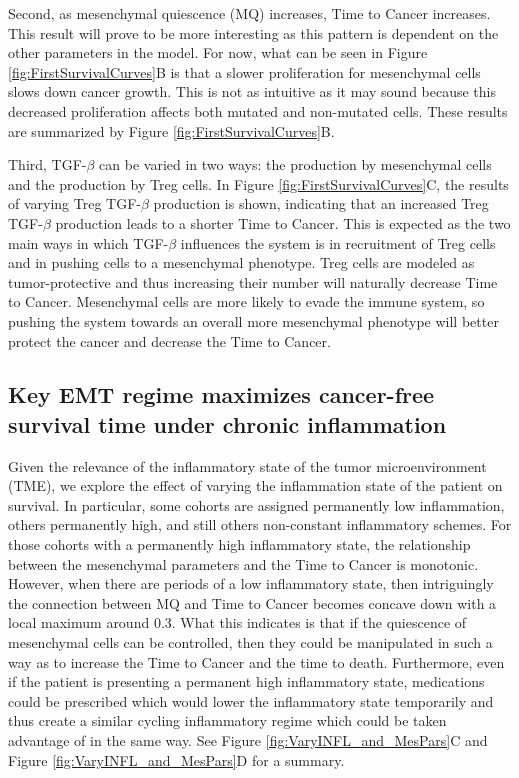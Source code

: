 \documentclass{article}
\begin{document}
Second, as mesenchymal quiescence (MQ) increases, Time to Cancer increases.
This result will prove to be more interesting as this pattern is dependent on the other parameters in the model.
For now, what can be seen in Figure \ref{fig:FirstSurvivalCurves}B is that a slower proliferation for mesenchymal cells slows down cancer growth.
This is not as intuitive as it may sound because this decreased proliferation affects both mutated and non-mutated cells.
These results are summarized by Figure \ref{fig:FirstSurvivalCurves}B.

Third, TGF-$\beta$ can be varied in two ways: the production by mesenchymal cells and the production by Treg cells.
In Figure \ref{fig:FirstSurvivalCurves}C, the results of varying Treg TGF-$\beta$ production is shown, indicating that an increased Treg TGF-$\beta$ production leads to a shorter Time to Cancer.
This is expected as the two main ways in which TGF-$\beta$ influences the system is in recruitment of Treg cells and in pushing cells to a mesenchymal phenotype.
Treg cells are modeled as tumor-protective and thus increasing their number will naturally decrease Time to Cancer.
Mesenchymal cells are more likely to evade the immune system, so pushing the system towards an overall more mesenchymal phenotype will better protect the cancer and decrease the Time to Cancer.

\subsection{Key EMT regime maximizes cancer-free survival time under chronic inflammation}\label{KeyEMT}
Given the relevance of the inflammatory state of the tumor microenvironment (TME), we explore the effect of varying the inflammation state of the patient on survival.
In particular, some cohorts are assigned permanently low inflammation, others permanently high, and still others non-constant inflammatory schemes.
For those cohorts with a permanently high inflammatory state, the relationship between the mesenchymal parameters and the Time to Cancer is monotonic.
However, when there are periods of a low inflammatory state, then intriguingly the connection between MQ and Time to Cancer becomes concave down with a local maximum around 0.3.
What this indicates is that if the quiescence of mesenchymal cells can be controlled, then they could be manipulated in such a way as to increase the Time to Cancer and the time to death.
Furthermore, even if the patient is presenting a permanent high inflammatory state, medications could be prescribed which would lower the inflammatory state temporarily and thus create a similar cycling inflammatory regime which could be taken advantage of in the same way.
See Figure \ref{fig:VaryINFL_and_MesPars}C and Figure \ref{fig:VaryINFL_and_MesPars}D for a summary.
\end{document}
